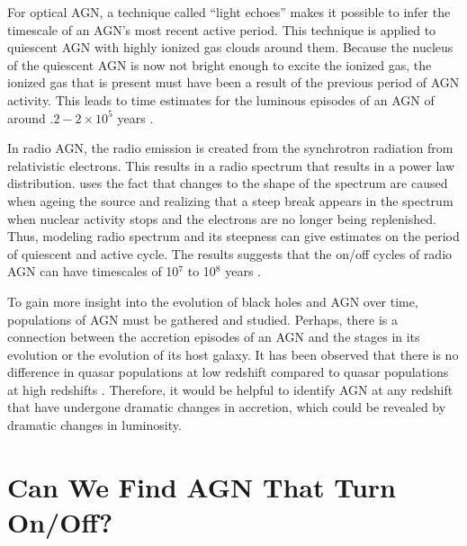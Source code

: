 For optical AGN, a technique called “light echoes” makes it possible  to infer the timescale of an AGN’s most recent active period. 
This technique is applied to quiescent AGN with highly ionized gas clouds around them. 
Because the nucleus of the quiescent AGN is now not bright enough to excite the ionized gas, the ionized gas that is present must have been a result of the previous period of AGN activity. 
This leads to time estimates for the luminous episodes of an AGN of around $.2 - 2\times 10^5$ years \citep{morganti2017}.

In radio AGN, the radio emission is created from the synchrotron radiation from relativistic electrons. 
This results in a radio spectrum that results in a power law distribution. 
\cite{morganti2017} uses the fact that changes to the shape of the spectrum are caused when ageing the source and realizing that a steep break appears in the spectrum when nuclear activity stops and the electrons are no longer being replenished. 
Thus, modeling radio spectrum and its steepness can give estimates on the period of quiescent and active cycle.
The results suggests that the on/off cycles of radio AGN can have timescales of 10$^7$ to 10$^8$ years \citep{morganti2017}.


To gain more insight into the evolution of black holes and AGN over time, populations of AGN must be gathered and studied.
Perhaps, there is a connection between the accretion episodes of an AGN and the stages in its evolution or the evolution of its host galaxy.
It has been observed that there is no difference in quasar populations at low redshift compared to quasar populations at high redshifts \citep{Elvis1994}.
Therefore, it would be helpful to identify AGN at any redshift that have undergone dramatic changes in accretion, which could be revealed by dramatic changes in luminosity.


\section{Can We Find AGN That Turn On/Off?}
\label{sub1_5}

